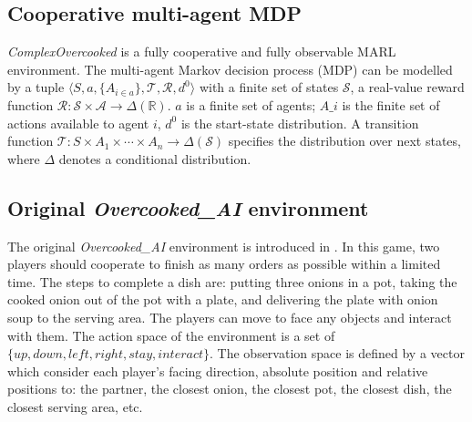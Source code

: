 \subsection{Cooperative multi-agent MDP}
\textit{ComplexOvercooked} is a fully cooperative and fully observable MARL environment. The multi-agent Markov decision process (MDP) can be modelled by a tuple $\langle S,a,\{A_{i\in{a}}\},\mathcal{T},\mathcal{R},d^0 \rangle$ with a finite set of states $\mathcal{S}$, a real-value reward function $\mathcal{R}:\mathcal{S}\times \mathcal{A} \to \Delta(\mathbb{R}) $. $a$ is a finite set of agents; $A\_{i}$ is the finite set of actions available to agent $i$, $d^0$ is the start-state distribution. 
A transition function $\mathcal{T}:S\times A_{1}\times\cdots\times A_{n} \to \Delta(\mathcal{S})$ specifies the distribution over next states, where $\Delta$ denotes a conditional distribution.

\subsection{Original \textit{Overcooked\_AI} environment}
The original \textit{Overcooked\_AI} environment is introduced in \cite{carroll2019utility}. In this game, two players should cooperate to finish as many orders as possible within a limited time. The steps to complete a dish are: putting three onions in a pot, taking the cooked onion out of the pot with a plate, and delivering the plate with onion soup to the serving area. The players can move to face any objects and interact with them. The action space of the environment is a set of $\{up, down, left, right, stay, interact\}$. The observation space is defined by a vector which consider each player’s facing direction, absolute position and relative positions to: the partner, the closest onion, the closest pot, the closest dish, the closest serving area, etc.


